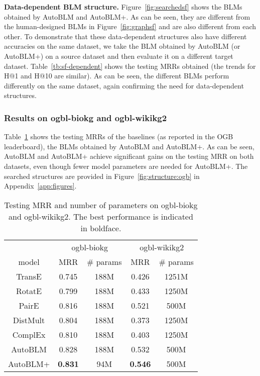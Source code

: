 \documentclass[10pt,journal,compsoc]{IEEEtran}
\begin{document}
\noindent
{\bf Data-dependent BLM structure.}
Figure~\ref{fig:searchedsf} 
shows the BLMs
obtained by 
AutoBLM and AutoBLM+. As can be seen,
they are different from 
the human-designed BLMs in Figure~\ref{fig:graphsf}
and are also different from each other.
To demonstrate that these data-dependent structures also have different accuracies on the same dataset,
we take the 
BLM obtained by AutoBLM (or AutoBLM+) on a source dataset and then 
evaluate it
on a different target dataset.
Table~\ref{tb:sf-dependent} shows the testing MRRs obtained (the trends
for H@1 and H@10  are
similar).
As can be seen,
the different BLMs perform differently on the same dataset, 
again confirming the
need for data-dependent structures.











\subsubsection{Results
on 
ogbl-biokg and ogbl-wikikg2}
\label{exp:kgc:ogb}




Table~\ref{tb:comparison:ogb} shows the testing MRRs of
the baselines (as reported in the OGB leaderboard),
the BLMs obtained by AutoBLM and AutoBLM+.
As can be seen,
AutoBLM and 
AutoBLM+ achieve significant gains on the testing MRR 
on both datasets, 
even though
fewer model parameters are needed for AutoBLM+.
The searched structures are provided in Figure~\ref{fig:structure:ogb}
in Appendix~\ref{app:figures}.

\begin{table}[ht]
	\vspace{-7px}
	\caption{Testing MRR and number of parameters on ogbl-biokg and ogbl-wikikg2.
The best performance is indicated in boldface.}
	\label{tb:comparison:ogb}
	\centering
		\setlength\tabcolsep{8pt}
	\vspace{-10px}
	\begin{tabular}{c|cc|cc}
		\toprule
		& \multicolumn{2}{c|}{ogbl-biokg} & \multicolumn{2}{c}{ogbl-wikikg2} \\
		model    & MRR & \# params & MRR  & \# params \\
		\midrule
		TransE   & 0.745      & 188M      & 0.426         & 1251M     \\
		RotatE   & 0.799  & 188M      & 0.433        & 1250M     \\
		PairE    	& 0.816     & 188M      & 0.521         & 500M      \\
		DistMult & 0.804      & 188M      & 0.373        & 1250M     \\
		ComplEx  & 0.810      & 188M      & 0.403         & 1250M     \\
		\midrule
		AutoBLM  &  {0.828}    &  188M   &   {0.532}  &  500M \\
		AutoBLM+ & \textbf{0.831}     & 94M       & \textbf{0.546}    & 500M     \\
		\bottomrule
	\end{tabular}
\vspace{-8px}
\end{table}
\end{document}
